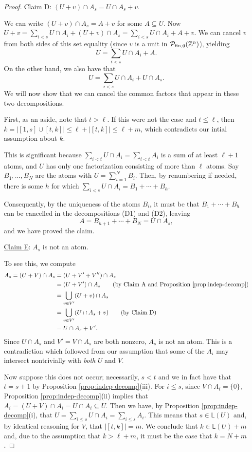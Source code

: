 \begin{proof}
\noindent\underline{Claim D}: $(U+v)\cap A_s = U\cap A_s + v$. \label{cld}

We can write $(U+v)\cap A_s = A + v$ for some $A \subseteq U$.
Now $U+v = \sum_{i<s} U\cap A_i + (U+v)\cap A_s = \sum_{i<s} U\cap A_i + A + v$.
We can cancel $v$ from both sides of this set equality (since $v$ is a unit in $\mathcal{P}_{\textrm{fin}, 0}(\mathbb{Z}^n)$), yielding
\[ U = \sum_{i<s} U\cap A_i + A. \tag{D1}\]
On the other hand, we also have that
\[ U = \sum_{i<s} U\cap A_i + U\cap A_s. \tag{D2}\]
We will now show that we can cancel the common factors that appear in these two decompositions.

First, as an aside, note that $t > \ell$.
If this were not the case and $t \le \ell$, then $k = | [ 1,s ] \cup [ t,k ] | \le \ell + | [ t,k ] | \le \ell+m$, which contradicts our intial assumption about $k$.

This is significant because $\sum_{i<t} U\cap A_i = \sum_{i<t} A_i$ is a sum of at least $\ell+1$ atoms, and $U$ has only one factorization consisting of more than $\ell$ atoms.
Say $B_1,\dots, B_{N}$ are the atoms with $U = \sum_{i=1}^{N} B_i$.
Then, by renumbering if needed, there is some $h$ for which $\sum_{i<s} U\cap A_i = B_1 + \cdots + B_h$.

Consequently, by the uniqueness of the atoms $B_i$, it must be that $B_1 +\cdots + B_h$ can be cancelled in the decompositions (D1) and (D2), leaving
\[ A = B_{h+1} +\cdots+ B_{N} = U\cap A_s, \]
and we have proved the claim.

\noindent\underline{Claim E}: $A_s$ is not an atom. \label{cle}

To see this, we compute
\begin{align*}
A_s = (U+V)\cap A_s 
&= (U+V'+V'') \cap A_s \\
&= (U+V') \cap A_s \tag{by Claim A and Proposition \ref{prop:indep-decomp}} \\
&= \bigcup_{v\in V'} (U+v)\cap A_s \\
&= \bigcup_{v\in V'} (U\cap A_s + v) \tag{by Claim D} \\
&= U\cap A_s + V'.
\end{align*}
Since $U\cap A_s$ and $V' = V\cap A_s$ are both nonzero, $A_s$ is not an atom.
This is a contradiction which followed from our assumption that some of the $A_i$ may intersect nontrivially with \textit{both} $U$ and $V$.

Now suppose this does not occur; necessarily, $s < t$ and we in fact have that $t = s+1$ by Proposition \ref{prop:indep-decomp}(iii).
For $i \le s$, since $V\cap A_i  = \{0\}$, Proposition \ref{prop:indep-decomp}(ii) implies that $A_i = (U+V)\cap A_i = U\cap A_i \subseteq U$.
Then we have, by Proposition \ref{prop:indep-decomp}(i), that $U = \sum_{i\le s} U\cap A_i = \sum_{i\le s} A_i$.
This means that $s\in \mathsf{L}(U)$ and, by identical reasoning for $V$, that $| [ t,k ]| = m$.
We conclude that $k \in \mathsf{L}(U) + m$ and, due to the assumption that $k>\ell+m$, it must be the case that $k = N + m$.
\end{proof}


